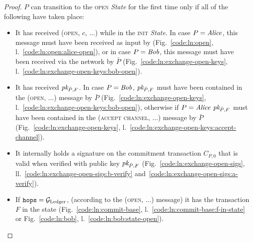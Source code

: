 \begin{proof}
  $P$ can transition to the \textsc{open} \textit{State} for the first time only
  if all of the following have taken place:
  \begin{itemize}
    \item It has received (\textsc{open}, $c$, $\dots$) while in the
    \textsc{init} \textit{State}. In case $P = \mathit{Alice}$, this message must have
    been received as input by \environment (Fig.~\ref{code:ln:open},
    l.~\ref{code:ln:open:alice-open}), or in case $P = \mathit{Bob}$, this message must
    have been received via the network by $\bar{P}$
    (Fig.~\ref{code:ln:exchange-open-keys},
    l.~\ref{code:ln:exchange-open-keys:bob-open}).
    \item It has received $\textit{pk}_{\bar{P}, F}$. In case $P = \mathit{Bob}$, $\textit{pk}_{\bar{P},
    F}$ must have been contained in the (\textsc{open}, $\dots$) message by
    $\bar{P}$ (Fig.~\ref{code:ln:exchange-open-keys},
    l.~\ref{code:ln:exchange-open-keys:bob-open}), otherwise if $P = \mathit{Alice}$
    $\textit{pk}_{\bar{P}, F}$ must have been contained in the (\textsc{accept channel},
    $\dots$) message by $\bar{P}$ (Fig.~\ref{code:ln:exchange-open-keys},
    l.~\ref{code:ln:exchange-open-keys:accept-channel}).
    \item It internally holds a signature on the commitment transaction $C_{P,
    0}$ that is valid when verified with public key $\textit{pk}_{\bar{P}, F}$
    (Fig.~\ref{code:ln:exchange-open-sigs},
    ll.~\ref{code:ln:exchange-open-sigs:b-verify}
    and~\ref{code:ln:exchange-open-sigs:a-verify}).
    \item If $\texttt{hops} = \mathcal{G}_{\mathrm{Ledger}}$, (according to the (\textsc{open},
    $\dots$) message) it has the transaction $F$ in the \ledger state
    (Fig.~\ref{code:ln:commit-base}, l.~\ref{code:ln:commit-base:f-in-state} or
    Fig.~\ref{code:ln:bob}, l.~\ref{code:ln:bob:state-open}).


\end{itemize}
\end{proof}
